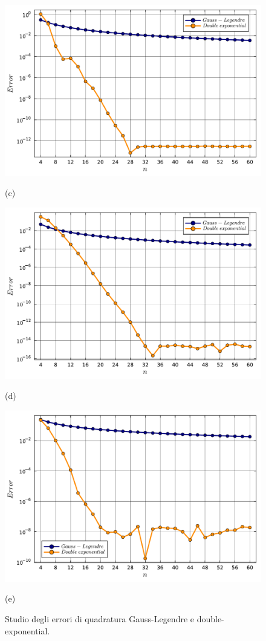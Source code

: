 \documentclass[letterpaper, 12pt]{article}
\numberwithin{equation}{section}    %
\begin{document}
\begin{figure}[!ht]
    \begin{minipage}[b]{0.40\textwidth}
        \includegraphics[width=\textwidth]{5433.pdf}
        \caption*{(c)}
    \end{minipage}
    \begin{minipage}[b]{0.40\textwidth}
        \includegraphics[width=\textwidth]{5434.pdf}
        \caption*{(d)}
    \end{minipage}
    \begin{minipage}[b]{0.40\textwidth}
        \includegraphics[width=\textwidth]{5435.pdf}
        \caption*{(e)}
    \end{minipage}
    \caption{Studio degli errori di quadratura Gauss-Legendre e double-exponential.}
    \label{fig:es5_4_3_1}
\end{figure}
\end{document}
